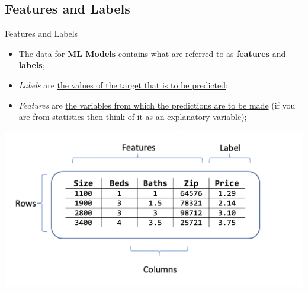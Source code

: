 \documentclass[11pt]{beamer}
\begin{document}
\subsection{Features and Labels}
%
\begin{frame}{Features and Labels}
	\begin{itemize}
		\item The data for \textbf{ML Models} contains what are referred to as \textbf{features} and \textbf{labels};
		\item \textit{Labels} are \ul{the values of the target that is to be predicted};
		\item \textit{Features} are \ul{the variables from which the predictions are to be made} (if you are from statistics then think of it as an explanatory variable);
	\end{itemize}
\begin{center}
\includegraphics[scale=.3]{../05-pictures/lesson-1-1_pic_6.png} 
\end{center}	
	
\end{frame}
\end{document}
